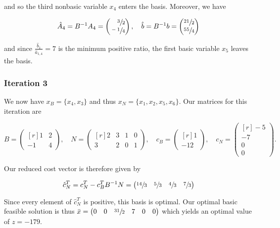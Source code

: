 \begin{solution}
  and so the third nonbasic variable $x_4$ enters the basis. Moreover, we have
  
  $$
  \hat{A}_4 = B^{-1} A_4 = \begin{pmatrix*}[r]
    \sfrac{3}{2}  \\
    \sfrac{-1}{4}
  \end{pmatrix*}, \quad \hat{b} = B^{-1} b = \begin{pmatrix*}[r]
    \sfrac{21}{2}  \\
    \sfrac{55}{4}
  \end{pmatrix*}
  $$

  and since $\frac{\hat{b}_1}{\hat{a}_{1,4}} = 7$ is the minimum positive ratio, the first basic variable $x_5$ leaves 
  the basis.

  \subsubsection*{Iteration 3}
  We now have $x_B = \{x_4, x_3\}$ and thus $x_N = \{x_1, x_2, x_5, x_6\}$. Our matrices for this iteration are

  $$
    B = \begin{pmatrix*}[r]
      1 & 2 \\
     -1 & 4
    \end{pmatrix*}, \quad N = \begin{pmatrix*}[r]
      2 & 3 &  1 & 0 \\
      3 & 2 &  0 & 1
    \end{pmatrix*}, \quad c_B = \begin{pmatrix*}[r]
      1 \\
     -12
    \end{pmatrix*}, \quad c_N = \begin{pmatrix*}[r]
     -5  \\
     -7  \\
      0  \\
      0
    \end{pmatrix*}.
  $$

  Our reduced cost vector is therefore given by 

  $$
  \hat{c}_N^T = c_N^T - c_B^T B^{-1} N = \begin{pmatrix*}[r]
     \sfrac{14}{3} & \sfrac{5}{3} & \sfrac{4}{3} & \sfrac{7}{3}
  \end{pmatrix*}
  $$

  Since every element of $\hat{c}_N^T$ is positive, this basis is optimal. Our optimal basic feasible solution is thus
  $\bar{x} = \begin{pmatrix*}[r]
    0 & 0 & \sfrac{31}{2} & 7 & 0 & 0
  \end{pmatrix*}$ which yields an optimal value of $z = -179$.
  \ \\
\end{solution}